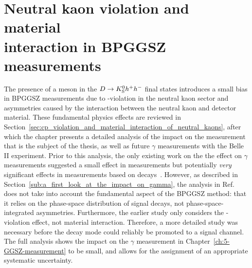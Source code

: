 

\chapter{\texorpdfstring{Neutral kaon \CP violation and material\\interaction in BPGGSZ measurements}{Neutral kaon CP violation and material interaction in BPGGSZ measurements}}
\label{ch:4-KS-CPV}

The presence of a \KS meson in the ${D}\rightarrow{\ensuremath{{K}^0_{\mathrm{S}}}} h^+h^-$ final states introduces a small bias in BPGGSZ measurements due to \CP-violation in the neutral kaon sector and asymmetries caused by the interaction between the neutral kaon and detector material. These fundamental physics effects are reviewed in Section~\ref{sec:cp_violation_and_material_interaction_of_neutral_kaons}, after which the chapter presents a detailed analysis of the impact on the \lhcb measurement that is the subject of the thesis,  as well as future $\gamma$ measurements with the Belle II experiment. 
Prior to this analysis, the only existing work on the the effect on $\gamma$ measurements suggested a small effect in \BtoDK measurements but potentially \emph{very} significant effects in measurements based on \BtoDpi decays~\cite{grossmanEffectsBarMixing2014}. However, as described in Section~\ref{sub:a_first_look_at_the_impact_on_gamma}, the analysis in Ref.~\cite{grossmanEffectsBarMixing2014} does not take into account the fundamental aspect of the BPGGSZ method: that it relies on the phase-space distribution of signal decays, not phase-space-integrated asymmetries. Furthermore, the earlier study only considers the \CP-violation effect, not material interaction. Therefore, a more detailed study was necessary before the \BtoDpi decay mode could reliably be promoted to a signal channel. The full analysis shows the impact on the $\gamma$ measurement in Chapter~\ref{ch:5-GGSZ-measurement} to be small, and allows for the assignment of an appropriate systematic uncertainty.



